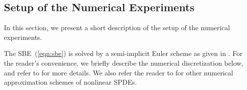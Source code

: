 \documentclass[11pt]{amsart}
\numberwithin{equation}{section}
\newcommand{\attn}{\color{greenrb}} %
\begin{document}



\subsection{Setup of the Numerical Experiments} \label{sec:numerical_setup}


In this section, we present a short description of the setup of the numerical experiments. %



\medskip
{} The SBE~(\ref{eqn:sbe}) is solved by a semi-implicit Euler scheme as given in \cite[Section~6.1]{CLW15_vol2}.
For the reader's convenience, we briefly describe the numerical discretization below, and refer to \cite[Section~6.1]{CLW15_vol2} for more details.
We also refer the reader to \cite{AG06, BJ13,burkardt2007reduced,Hou_al06,JK11,LR04} for other numerical approximation schemes of nonlinear SPDEs.
 
\end{document}
